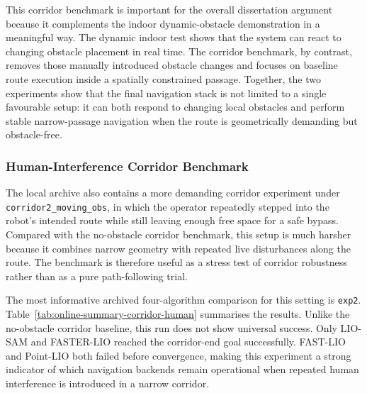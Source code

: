 \documentclass[12pt,a4paper]{report}
\begin{document}
This corridor benchmark is important for the overall dissertation argument because it complements the indoor dynamic-obstacle demonstration in a meaningful way. The dynamic indoor test shows that the system can react to changing obstacle placement in real time. The corridor benchmark, by contrast, removes those manually introduced obstacle changes and focuses on baseline route execution inside a spatially constrained passage. Together, the two experiments show that the final navigation stack is not limited to a single favourable setup: it can both respond to changing local obstacles and perform stable narrow-passage navigation when the route is geometrically demanding but obstacle-free.

\subsubsection{Human-Interference Corridor Benchmark}
The local archive also contains a more demanding corridor experiment under \texttt{corridor2\_moving\_obs}, in which the operator repeatedly stepped into the robot's intended route while still leaving enough free space for a safe bypass. Compared with the no-obstacle corridor benchmark, this setup is much harsher because it combines narrow geometry with repeated live disturbances along the route. The benchmark is therefore useful as a stress test of corridor robustness rather than as a pure path-following trial.

The most informative archived four-algorithm comparison for this setting is \texttt{exp2}. Table~\ref{tab:online-summary-corridor-human} summarises the results. Unlike the no-obstacle corridor baseline, this run does not show universal success. Only LIO-SAM and FASTER-LIO reached the corridor-end goal successfully. FAST-LIO and Point-LIO both failed before convergence, making this experiment a strong indicator of which navigation backends remain operational when repeated human interference is introduced in a narrow corridor.

\begin{table}[H]
\centering
\scriptsize
\caption{Online results for the human-interference corridor benchmark (\texttt{corridor2\_moving\_obs}, \texttt{exp2}).}
\label{tab:online-summary-corridor-human}
\setlength{\tabcolsep}{3pt}
\renewcommand{\arraystretch}{1.05}
\end{table}
\end{document}
